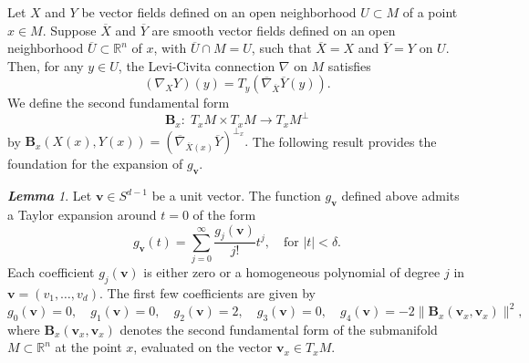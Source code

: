 \documentclass{amsart}
\theoremstyle{Theorem}
\theoremstyle{remark}
\newtheorem{lem}{\bf Lemma}[section]
\numberwithin{equation}{section} \numberwithin{figure}{section}
\renewcommand*{\to}{\rightarrow}
\renewcommand*{\bar}[1]{\overline{#1}}
\begin{document}
Let \( X \) and \( Y \) be vector fields defined on an open neighborhood \( U \subset M \) of a point \( x \in M \). Suppose \( \bar{X} \) and \( \bar{Y} \) are smooth vector fields defined on an open neighborhood \( \bar{U} \subset \mathbb{R}^n \) of \( x \), with \( \bar{U} \cap M = U \), such that \( \bar{X} = X \) and \( \bar{Y} = Y \) on \( U \). Then, for any \( y \in U \), the Levi-Civita connection \( \nabla \) on \( M \) satisfies
\[
(\nabla_X Y)(y) = T_y \left( \bar{\nabla}_{\bar{X}} \bar{Y} (y) \right).
\]
We define the second fundamental form
\[
\mathbf{B}_x :\; T_x M \times T_x M \to T_x M^{\perp}
\]
by
\(
\mathbf{B}_x(X(x), Y(x)) =(\bar{\nabla}_{\bar{X}(x)} \bar{Y})^{\perp_x}.
\)
The following result provides the foundation for the expansion of \( g_{\mathbf{v}} \).
\begin{lem}\label{tmetric}
Let \( \mathbf{v} \in S^{d-1} \) be a unit vector. The function \( g_{\mathbf{v}} \) defined above admits a Taylor expansion around \( t = 0 \) of the form
\[
g_{\mathbf{v}}(t) = \sum_{j=0}^{\infty} \frac{g_j(\mathbf{v})}{j!} t^j, \quad \text{for } |t| < \delta.
\]
Each coefficient \( g_j(\mathbf{v}) \) is either zero or a homogeneous polynomial of degree \( j \) in \( \mathbf{v} = (v_1, \dots, v_d) \). The first few coefficients are given by
\[
g_0(\mathbf{v}) = 0, \quad 
g_1(\mathbf{v}) = 0, \quad 
g_2(\mathbf{v}) = 2, \quad 
g_3(\mathbf{v}) = 0, \quad 
g_4(\mathbf{v}) = -2 \| \mathbf{B}_x(\mathbf{v}_x, \mathbf{v}_x) \|^2,
\]
where \( \mathbf{B}_x(\mathbf{v}_x, \mathbf{v}_x) \) denotes the second fundamental form of the submanifold \( M \subset \mathbb{R}^n \) at the point \( x \), evaluated on the vector \( \mathbf{v}_x \in T_x M \).
\end{lem}
\end{document}
